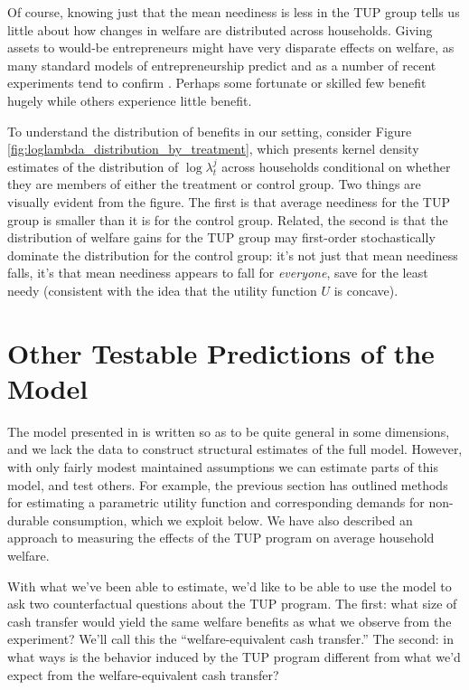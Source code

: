 \documentclass[12pt,letterpaper]{article}
\newcommand{\Fig}[1]{Figure \ref{fig:#1}} \newcommand{\Tab}[1]{Table \ref{tab:#1}}
\begin{document}
Of course, knowing just that the mean neediness is less in the TUP
group tells us little about how changes in welfare are distributed
across households.  Giving assets to would-be entrepreneurs might have
very disparate effects on welfare, as many standard models of
entrepreneurship predict
\citep{banerjee-newman93,paulson-etal06,karaivanov-townsend14} and as
a number of recent experiments tend to confirm \citep{demel-etal08,mckenzie-woodruff08,fafchamps-etal11}.
Perhaps some fortunate or skilled few benefit hugely while others
experience little benefit.  

To understand the distribution of benefits in our setting, consider
\Fig{loglambda_distribution_by_treatment}, which presents kernel
density estimates of the distribution of \(\log\lambda^j_t\) across
households conditional on whether they are members of either the
treatment or control group.  Two things are visually evident from the
figure.  The first is that average neediness for the TUP group is
smaller than it is for the control group.  Related, the second is that
the distribution of welfare gains for the TUP group may first-order
stochastically dominate the distribution for the control group: it's
not just that mean neediness falls, it's that mean neediness appears
to fall for \emph{everyone}, save for the least needy (consistent with the
idea that the utility function \(U\) is concave).  


\section{Other Testable Predictions of the Model}
\label{sec:orgheadline15}
The model presented in  is written so as to be quite
general in some dimensions, and we lack the data to construct
structural estimates of the full model.  However, with only fairly
modest maintained assumptions we can estimate parts of this model,
and test others.  For example, the previous section has outlined
methods for estimating a parametric utility function and
corresponding demands for non-durable consumption, which we exploit
below.  We have also described an approach to measuring the effects
of the TUP program on average household welfare.

With what we've been able to estimate, we'd like to be able to use
the model to ask two counterfactual questions about the TUP
program.  The first: what size of cash transfer would yield the
same welfare benefits as what we observe from the experiment?
We'll call this the ``welfare-equivalent cash transfer.''  The
second: in what ways is the behavior induced by the TUP program
different from what we'd expect from the welfare-equivalent cash
transfer?
\end{document}
